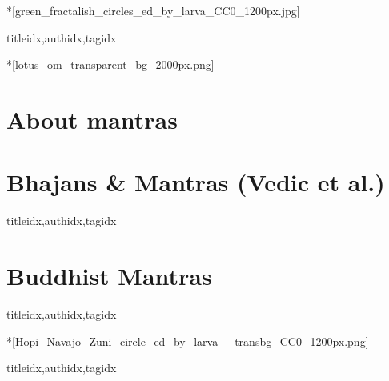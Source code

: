 
  \setcounter{chapter}{2}

  *[green_fractalish_circles_ed_by_larva_CC0_1200px.jpg]
    \begin{songs}{titleidx,authidx,tagidx}
      
    \end{songs}

  *[lotus_om_transparent_bg_2000px.png]
    \section{About mantras}
      
    \clearpage\scleardpage
    \section{Bhajans \& Mantras (Vedic et al.)}
      \begin{songs}{titleidx,authidx,tagidx}
        
      \end{songs}
    \scleardpage
    \section{Buddhist Mantras}
      \begin{songs}{titleidx,authidx,tagidx}
        
      \end{songs}

  *[Hopi_Navajo_Zuni_circle_ed_by_larva__transbg_CC0_1200px.png]
    \begin{songs}{titleidx,authidx,tagidx}
      
    \end{songs}

